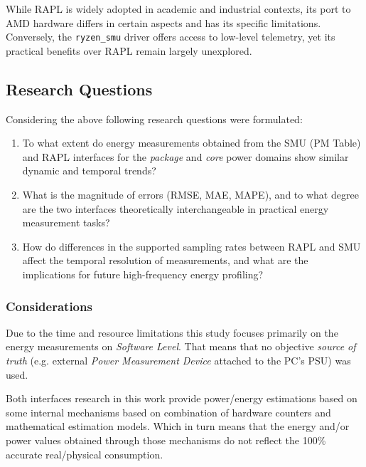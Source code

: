 While \gls{RAPL} is widely adopted in academic and industrial contexts, its
port to AMD hardware differs in certain aspects and has its specific limitations.
Conversely, the \texttt{ryzen\_smu} driver offers access to low-level telemetry,
yet its practical benefits over \gls{RAPL} remain largely unexplored.

\subsection{Research Questions}

Considering the above following research questions were formulated:

\begin{enumerate}
  \item To what extent do energy measurements obtained from the
        \gls{SMU} (\gls{PM} Table) and \gls{RAPL} interfaces for the
        \emph{package} and \emph{core} power domains show similar
        dynamic and temporal trends?
      \item What is the magnitude of errors (\gls{RMSE}, \gls{MAE}, \gls{MAPE}),
        and to what degree are the two interfaces theoretically interchangeable
        in practical energy measurement tasks?
      \item How do differences in the supported sampling rates between
        \gls{RAPL} and \gls{SMU} affect the temporal resolution of measurements,
        and what are the implications for future high-frequency energy profiling?
\end{enumerate}

\subsubsection{Considerations}

Due to the time and resource limitations this study focuses primarily on the
energy measurements on \emph{Software Level}. That means that no objective
\emph{source of truth} (e.g. external \emph{Power Measurement Device}
attached to the \gls{PC}'s \gls{PSU}) was used.

Both interfaces research in this work provide power/energy estimations based
on some internal mechanisms based on combination of hardware counters and
mathematical estimation models. Which in turn means that the energy and/or
power values obtained through those mechanisms do not reflect the 100\%
accurate real/physical consumption.
